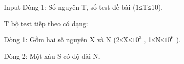 Input
Dòng 1: Số nguyên T, số test đề bài (1≤T≤10).  

   T bộ test tiếp theo có dạng:  

   Dòng 1: Gồm hai số nguyên X và N (2≤X≤$10^{3}$   , 1≤N≤$10^{6}$   ).  

   Dòng 2: Một xâu S có độ dài N.